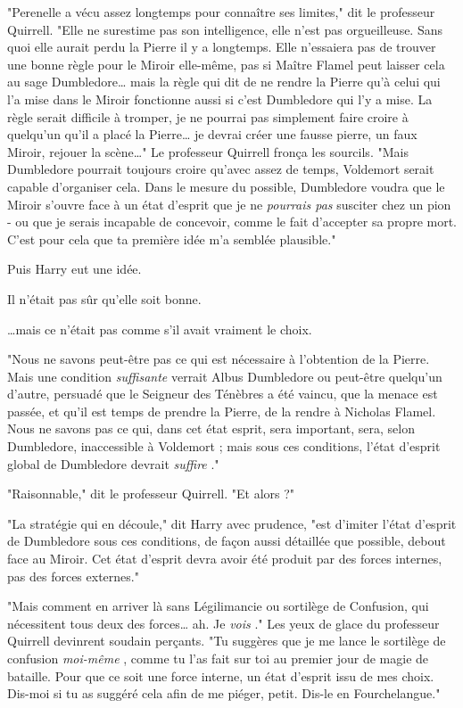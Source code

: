"Perenelle a vécu assez longtemps pour connaître ses limites," dit le professeur Quirrell. "Elle ne surestime pas son intelligence, elle n'est pas orgueilleuse. Sans quoi elle aurait perdu la Pierre il y a longtemps. Elle n'essaiera pas de trouver une bonne règle pour le Miroir elle-même, pas si Maître Flamel peut laisser cela au sage Dumbledore… mais la règle qui dit de ne rendre la Pierre qu'à celui qui l'a mise dans le Miroir fonctionne aussi si c'est Dumbledore qui l'y a mise. La règle serait difficile à tromper, je ne pourrai pas simplement faire croire à quelqu'un qu'il a placé la Pierre… je devrai créer une fausse pierre, un faux Miroir, rejouer la scène…" Le professeur Quirrell fronça les sourcils. "Mais Dumbledore pourrait toujours croire qu'avec assez de temps, Voldemort serait capable d'organiser cela. Dans le mesure du possible, Dumbledore voudra que le Miroir s'ouvre face à un état d'esprit que je ne \emph{pourrais pas}  susciter chez un pion - ou que je serais incapable de concevoir, comme le fait d'accepter sa propre mort. C'est pour cela que ta première idée m'a semblée plausible."

Puis Harry eut une idée.

Il n'était pas sûr qu'elle soit bonne.

…mais ce n'était pas comme s'il avait vraiment le choix.

"Nous ne savons peut-être pas ce qui est nécessaire à l'obtention de la Pierre. Mais une condition \emph{suffisante}  verrait Albus Dumbledore ou peut-être quelqu'un d'autre, persuadé que le Seigneur des Ténèbres a été vaincu, que la menace est passée, et qu'il est temps de prendre la Pierre, de la rendre à Nicholas Flamel. Nous ne savons pas ce qui, dans cet état esprit, sera important, sera, selon Dumbledore, inaccessible à Voldemort ; mais sous ces conditions, l'état d'esprit global de Dumbledore devrait \emph{suffire} ."

"Raisonnable," dit le professeur Quirrell. "Et alors ?"

"La stratégie qui en découle," dit Harry avec prudence, "est d'imiter l'état d'esprit de Dumbledore sous ces conditions, de façon aussi détaillée que possible, debout face au Miroir. Cet état d'esprit devra avoir été produit par des forces internes, pas des forces externes."

"Mais comment en arriver là sans Légilimancie ou sortilège de Confusion, qui nécessitent tous deux des forces… ah. Je \emph{vois} ." Les yeux de glace du professeur Quirrell devinrent soudain perçants. "Tu suggères que je me lance le sortilège de confusion \emph{moi-même} , comme tu l'as fait sur toi au premier jour de magie de bataille. Pour que ce soit une force interne, un état d'esprit issu de mes choix. Dis-moi si tu as suggéré cela afin de me piéger, petit. Dis-le en Fourchelangue."

